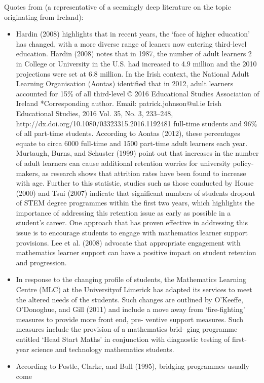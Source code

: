 \documentclass[twoside,12pt,a4paper]{report}
\begin{document}
Quotes from \cite{Johnson2016} (a representative of a seemingly deep literature on the topic originating from Ireland):
\begin{itemize}
	\item Hardin (2008) highlights that in recent years, the ‘face
of higher education’ has changed, with a more diverse range of leaners now entering
third-level education. Hardin (2008) notes that in 1987, the number of adult learners 2
in College or University in the U.S. had increased to 4.9 million and the 2010 projections
were set at 6.8 million. In the Irish context, the National Adult Learning Organisation
(Aontas) identified that in 2012, adult learners accounted for 15\% of all third-level
© 2016 Educational Studies Association of Ireland
*Corresponding author. Email: patrick.johnson@ul.ie
Irish Educational Studies, 2016
Vol. 35, No. 3, 233–248, http://dx.doi.org/10.1080/03323315.2016.1192481
full-time students and 96\% of all part-time students. According to Aontas (2012), these
percentages equate to circa 6000 full-time and 1500 part-time adult learners each year.
Murtaugh, Burns, and Schuster (1999) point out that increases in the number of adult
learners can cause additional retention worries for university policy-makers, as research
shows that attrition rates have been found to increase with age. Further to this statistic,
studies such as those conducted by House (2000) and Tsui (2007) indicate that significant
numbers of students dropout of STEM degree programmes within the first two years,
which highlights the importance of addressing this retention issue as early as possible
in a student’s career. One approach that has proven effective in addressing this issue is
to encourage students to engage with mathematics learner support provisions. Lee
et al. (2008) advocate that appropriate engagement with mathematics learner support
can have a positive impact on student retention and progression.
	\item In response to the changing profile of students, the Mathematics Learning Centre
(MLC) at the Universityof Limerick has adapted its services to meet the altered needs
of the students. Such changes are outlined by O’Keeffe, O’Donoghue, and Gill (2011)
and include a move away from ‘fire-fighting’ measures to provide more front end, pre-
ventive support measures. Such measures include the provision of a mathematics brid-
ging programme entitled ‘Head Start Maths’ in conjunction with diagnostic testing of
first-year science and technology mathematics students.
	\item According to Postle, Clarke, and Bull (1995), bridging programmes usually come

\end{itemize}
\end{document}

